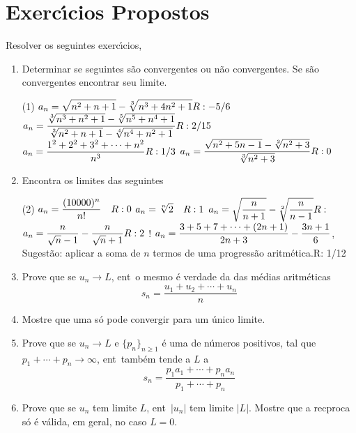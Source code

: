 \section*{Exerc\'{\i}cios Propostos}
Resolver os seguintes exerc\'{\i}cios,
\begin{enumerate}[label=(\arabic*)]
\item Determinar se seguintes \seqs s\~{a}o convergentes ou n\~{a}o convergentes. Se s\~{a}o convergentes 
encontrar seu limite.
\begin{tasks}[label=\rm{(\alph*)},item-indent=3em,label-width=4ex,ref=\rm{(\alph*)}](1)
\task  $\dst{a_n=\sqrt{n^2+n+1}-\sqrt[3]{n^3+4n^2+1}} \hfill  R: -5/6$
\task  $\dst{a_n=\frac{\sqrt[3]{n^3+n^2+1}-\sqrt[5]{n^5+n^4+1}}{\sqrt[2]{n^2+n+1}-\sqrt[4]{n^4+n^2+1}}}\hfill  R: 2/15$
\task  $\dst{a_n=\frac{1^2+2^2+3^2+\cdots+n^2}{n^3}}\hfill  R: 1/3$
\task  $\dst{a_n=\frac{\sqrt{n^2+5n-1}-\sqrt[2]{n^2+3}}{\sqrt[3]{n^2+3}}}\hfill  R: 0$
\end{tasks}
\item Encontra os limites das seguintes \seqs
\begin{tasks}[label=\rm{(\alph*)},item-indent=4em,label-width=4ex,ref=\rm{(\alph*)}](2)
\task  $\displaystyle{a_n=\dfrac{(10000)^n}{n!}} \quad  R: 0$
\task $\displaystyle{a_n=\sqrt[n]{2}}\quad  R: 1$
\task  $\dst{a_n=\sqrt{\dfrac{n}{n+1}}-\sqrt[2]{\frac{n}{n-1}}}\hfill  R: $
\task  $\dst{a_n=\frac{n}{\sqrt{n}-1}-\frac{n}{\sqrt{n}+1}} \hfill R: 2$
\task! $\displaystyle{a_n=\frac{3+5+7+\cdots+(2n+1)}{2n+3}-\dfrac{3n+1}{6}}$,\quad 
Sugest\~{a}o: aplicar a soma  de $n$ termos de uma progress\~{a}o
aritm\'{e}tica.\quad  R: 1/12
\end{tasks}

\item Prove que se $u_n\to L$, ent\ao\ o mesmo \'e verdade da \seq
das m\'edias aritm\'eticas $$s_n=\frac{u_1+u_2+\cdots+u_n}{n}$$

\item Mostre que uma \seq s\'o pode convergir  para um \'unico limite.

\item Prove que se $u_n\to L$ e $\{p_n\}_{n\geq1}$ \'e uma \seq de
n\'umeros positivos,
 tal que $p_1+\cdots +p_n \to \infty$, ent\ao\ tamb\'em tende a $L$ a \seq
 \begin{equation*}
  s_n = \frac{p_1 a_1+\cdots+p_n a_n}{p_1+\cdots+p_n}
 \end{equation*}
 

\item Prove que se $u_n$ tem limite $L$, ent\ao\ $|u_n|$ tem
   limite $|L|$.  Mostre que a rec\ii proca s\'o \'e v\'alida, em geral, no caso $L = 0$.


\end{enumerate}
